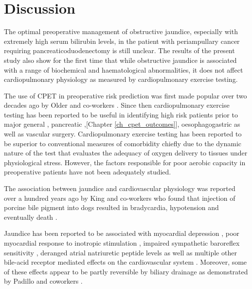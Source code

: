 \clearpage

\section{Discussion}
The optimal preoperative management of obstructive jaundice, especially with extremely high serum bilirubin levels, in the patient with periampullary cancer requiring pancreaticoduodenectomy is still unclear. 
The results of the present study also show for the first time that while obstructive jaundice is associated with a range of biochemical and haematological abnormalities, it does not affect cardiopulmonary physiology as measured by cardiopulmonary exercise testing. 

The use of CPET in preoperative risk prediction was first made popular over two decades ago by Older and co-workers \parencite{older_preoperative_1993}. 
Since then cardiopulmonary exercise testing has been reported to be useful in identifying high risk patients prior to major general \parencite{snowden_submaximal_2010}, pancreatic \parencite{ausania_effects_2012},[Chapter \ref{ch_cpet_outcomes}], oesophagogastric \parencite{nagamatsu_preoperative_2001} as well as vascular \parencite{carlisle_mid-term_2007} surgery. 
Cardiopulmonary exercise testing has been reported to be superior to conventional measures of comorbidity chiefly due to the dynamic nature of the test that evaluates the adequacy of oxygen delivery to tissues under physiological stress. 
However, the factors responsible for poor aerobic capacity in preoperative patients have not been adequately studied.

The association between jaundice and cardiovascular physiology was reported over a hundred years ago by King and co-workers who found that injection of porcine bile pigment into dogs resulted in bradycardia, hypotension and eventually death \parencite{king_effect_1909}.

Jaundice has been reported to be associated with myocardial depression \parencite{green_jaundiced_1986}, poor myocardial response to inotropic stimulation \parencite{lumlertgul_jaundiced_1991}, impaired sympathetic baroreflex sensitivity \parencite{song_baroreflex_2009}, deranged atrial natriuretic peptide levels \parencite{pereira_increased_1994,gallardo_increased_1998} as well as multiple other bile-acid receptor mediated effects on the cardiovascular system \parencite{khurana_bile_2011}. 
Moreover, some of these effects appear to be partly reversible by biliary drainage as demonstrated by Padillo and coworkers \parencite{padillo_improved_2001}.

